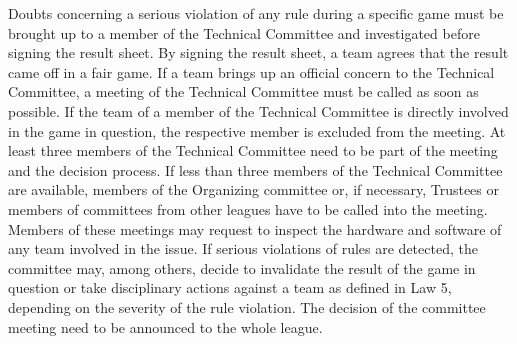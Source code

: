 Doubts concerning a serious violation of any rule during a specific game must be brought up to a member of the Technical Committee and investigated before signing the result sheet. By signing the result sheet, a team agrees that the result came off in a fair game. If a team brings up an official concern to the Technical Committee, a meeting of the Technical Committee must be called as soon as possible. If the team of a member of the Technical Committee is directly involved in the game in question, the respective member is excluded from the meeting. At least three members of the Technical Committee need to be part of the meeting and the decision process. If less than three members of the Technical Committee are available, members of the Organizing committee or, if necessary, Trustees or members of committees from other leagues have to be called into the meeting. Members of these meetings may request to inspect the hardware and software of any team involved in the issue. If serious violations of rules are detected, the committee may, among others, decide to invalidate the result of the game in question or take disciplinary actions against a team as defined in Law 5, depending on the severity of the rule violation. The decision of the committee meeting need to be announced to the whole league.

